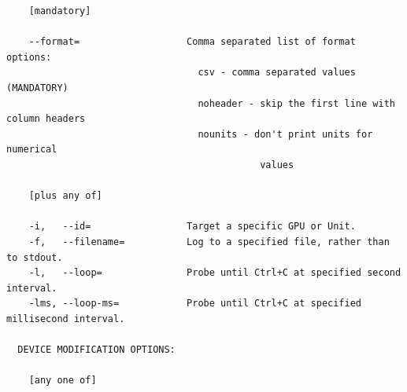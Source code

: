 \begin{lstlisting}
    [mandatory]

    --format=                   Comma separated list of format options:
                                  csv - comma separated values (MANDATORY)
                                  noheader - skip the first line with column headers
                                  nounits - don't print units for numerical
                                             values

    [plus any of]

    -i,   --id=                 Target a specific GPU or Unit.
    -f,   --filename=           Log to a specified file, rather than to stdout.
    -l,   --loop=               Probe until Ctrl+C at specified second interval.
    -lms, --loop-ms=            Probe until Ctrl+C at specified millisecond interval.

  DEVICE MODIFICATION OPTIONS:

    [any one of]


\end{lstlisting}
